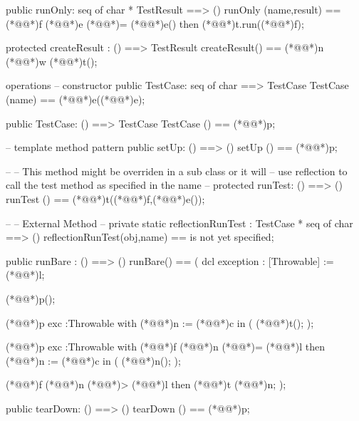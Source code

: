 \documentclass[a4paper]{article}
\begin{document}
\begin{vdm_al}
 public runOnly: seq of char * TestResult ==> ()
 runOnly (name,result) ==
 (*@@*)f (*@@*)e (*@\vdmnotcovered{}@*)= (*@@*)e() then
  (*@@*)t.run((*@@*)f);
  
    protected createResult : () ==> TestResult
    createResult() == (*@@*)n (*@@*)w (*@@*)t();
 
operations
  -- constructor
  public TestCase: seq of char ==> TestCase
  TestCase (name) == (*@@*)e((*@@*)e);

  public TestCase: () ==> TestCase
  TestCase () == (*@@*)p;
    
  -- template method pattern
  public setUp: () ==> ()
  setUp () == (*@@*)p;
  
  --
  -- This method might be overriden in a sub class or it will
  --  use reflection to call the test method as specified in the name
  --
  protected runTest: () ==> ()
  runTest () == (*@@*)t((*@@*)f,(*@@*)e());

  --
  -- External Method
  --
  private static reflectionRunTest : TestCase * seq of char ==> ()
  reflectionRunTest(obj,name) == is not yet specified;
     
  public runBare : () ==> ()
  runBare() ==
  (
    dcl exception : [Throwable] := (*@@*)l;
    
    (*@@*)p();
    
    (*@@*)p exc :Throwable
        with  
            (*@@*)n := (*@@*)c
        in
        (
            (*@@*)t();
        );

    (*@@*)p exc :Throwable
        with  
            (*@@*)f (*@@*)n (*@\vdmnotcovered{}@*)= (*@@*)l then
                (*@@*)n := (*@@*)c
        in
        (
            (*@@*)n();
        );
        
    (*@@*)f (*@@*)n (*@\vdmnotcovered{<}@*)> (*@@*)l then (*@@*)t (*@@*)n;
   );
  
  public tearDown: () ==> ()
  tearDown () == (*@@*)p;
           

\end{vdm_al}
\end{document}
